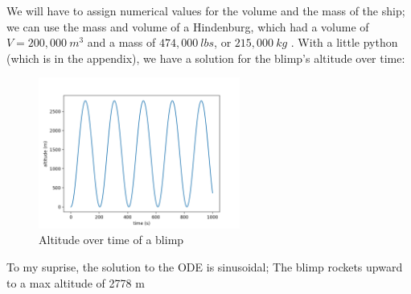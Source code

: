 \documentclass[titlepage]{article}
\begin{document}
\newpage

We will have to assign numerical values for the volume and the mass of the ship; we can use the mass and volume of a Hindenburg, which had a volume of $V = 200,000~m^3$ and a mass of $474,000~lbs$, or $215,000~kg$ \cite{zeppelin}. With a little python (which is in the appendix), we have a solution for the blimp's altitude over time:
\begin{figure}[h]
    \centering
    \includegraphics[width=250px]{p1_altitude_over_time.png}
    \caption{Altitude over time of a blimp}
\end{figure}
To my suprise, the solution to the ODE is sinusoidal; The blimp rockets upward to a max altitude of 2778 m

\newpage



\thispagestyle{empty}
\end{document}
